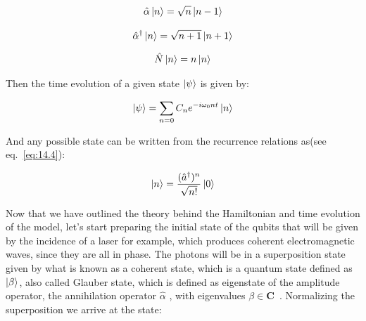 \documentclass[
  journal=largetwo,
  year=2023,
]{cup-journal}
\begin{document}
\begin{equation}
  \begin{aligned}\label{eq:14.3}
    \hat{\alpha}\ket{n} = \sqrt{n}\ket{n-1}
  \end{aligned}
\end{equation}

\begin{equation}
  \begin{aligned}\label{eq:14.4}
    \hat{\alpha}^{\dag}\ket{n} = \sqrt{n+1}\ket{n+1}
  \end{aligned}
\end{equation}

\begin{equation}
  \begin{aligned}\label{eq:14.5}
    \hat{N}\ket{n} = n\ket{n}
  \end{aligned}
\end{equation}

Then the time evolution of a given state \(\ket{\psi}\) is given by:

\begin{equation}
  \begin{aligned}\label{eq:14.6}
    \ket{\psi} = \sum_{n=0}{C_n e^{-i\omega_0nt}\ket{n}}
  \end{aligned}
\end{equation}

And any possible state can be written from the recurrence relations as(see eq.~\ref{eq:14.4}):

\begin{equation}
  \begin{aligned}\label{eq:14.7}
    \ket{n} = \frac{(\hat{a}^{\dag})^n}{\sqrt{n!}}\ket{0}
  \end{aligned}
\end{equation}


Now that we have outlined the theory behind the Hamiltonian and time evolution of the model, let's start preparing the initial state of the qubits that will be given by the incidence of a laser for example, which produces coherent electromagnetic waves, since they are all in phase. The photons will be in a superposition state given by what is known as a coherent state, which is a quantum state defined as \(\ket{\beta}\), also called Glauber state, which is defined as eigenstate of the amplitude operator, the annihilation operator \(\hat{\alpha}\) , with eigenvalues \(\beta \in \textbf{C}\)~\autocite{bertlmann_2008_theoretical}.
Normalizing the superposition we arrive at the state:
\end{document}
